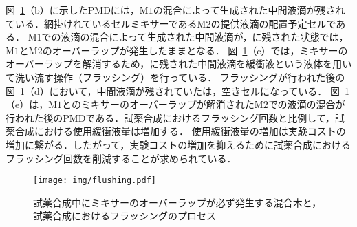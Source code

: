     図~\ref{fig:flushing}（b）に示したPMDには，M$1$の混合によって生成された中間液滴が残されている．網掛けれているセルミキサーであるM$2$の提供液滴の配置予定セルである．
    M$1$での液滴の混合によって生成された中間液滴が，に残された状態では，M$1$とM$2$のオーバーラップが発生したままとなる．
    図~\ref{fig:flushing}（c）では，ミキサーのオーバーラップを解消するため，に残された中間液滴を緩衝液という液体を用いて洗い流す操作（フラッシング）を行っている．
    フラッシングが行われた後の図~\ref{fig:flushing}（d）において，中間液滴が残されていたは，空きセルになっている．
    図~\ref{fig:flushing}（e）は，M$1$とのミキサーのオーバーラップが解消されたM$2$での液滴の混合が行われた後のPMDである．試薬合成におけるフラッシング回数と比例して，試薬合成における使用緩衝液量は増加する．
    使用緩衝液量の増加は実験コストの増加に繋がる．したがって，実験コストの増加を抑えるために試薬合成におけるフラッシング回数を削減することが求められている．

 \begin{figure}[tbp]
    \centering\texttt{[image: img/flushing.pdf]}
    \caption{試薬合成中にミキサーのオーバーラップが必ず発生する混合木と，試薬合成におけるフラッシングのプロセス}\label{fig:flushing}
    
\end{figure}

